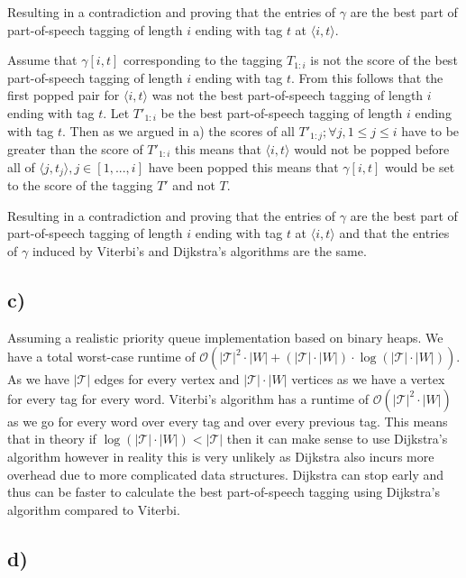 \documentclass[a4paper,12pt]{ETHexercise}
\begin{document}
Resulting in a contradiction and proving that the entries of $\gamma$ are the best part of part-of-speech tagging of length $i$ ending with tag $t$ at $\langle i, t\rangle$.

Assume that $\gamma[i,t]$ corresponding to the tagging $T_{1:i}$ is not the score of the best part-of-speech tagging of length $i$ ending with tag $t$. From this follows that the first popped pair for $\langle i, t\rangle$ was not the best part-of-speech tagging of length $i$ ending with tag $t$. Let $T'_{1:i}$ be the best part-of-speech tagging of length $i$ ending with tag $t$.
Then as we argued in a) the scores of all $T'_{1:j}; \forall j , 1 \leq j \leq i$ have to be greater than the score of $T'_{1:i}$ this means that $\langle i, t\rangle$ would not be popped before all of $\langle j, t_j\rangle, j \in [1,...,i]$ have been popped this means that $\gamma[i,t]$ would be set to the score of the tagging $T'$ and not $T$.

Resulting in a contradiction and proving that the entries of $\gamma$ are the best part of part-of-speech tagging of length $i$ ending with tag $t$ at $\langle i, t\rangle$ and that the entries of $\gamma$ induced by Viterbi's and Dijkstra's algorithms are the same.

\subsection*{c)}
Assuming a realistic priority queue implementation based on binary heaps. We have a total worst-case runtime of $\mathcal{O}(|\mathcal{T}|^2 \cdot |W| + (|\mathcal{T}| \cdot |W|) \cdot \log (|\mathcal{T}| \cdot |W|))$. As we have $|\mathcal{T}|$ edges for every vertex and $|\mathcal{T}| \cdot |W|$ vertices as we have a vertex for every tag for every word. 
Viterbi's algorithm has a runtime of $\mathcal{O}(|\mathcal{T}|^2 \cdot |W|)$ as we go for every word over every tag and over every previous tag. This means that in theory if $\log(|\mathcal{T}| \cdot |W|) < |\mathcal{T}|$ then it can make sense to use Dijkstra's algorithm however in reality this is very unlikely as Dijkstra also incurs more overhead due to more complicated data structures. Dijkstra can stop early and thus can be faster to calculate the best part-of-speech tagging using Dijkstra's algorithm compared to Viterbi.

\subsection*{d)}
\end{document}
